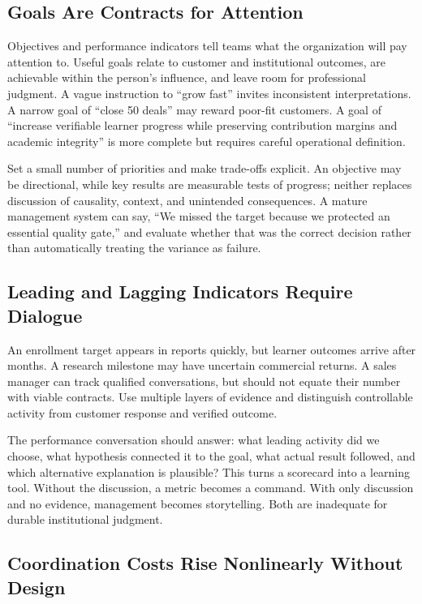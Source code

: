 \subsection{Goals Are Contracts for Attention}
\label{sec:goals_contracts_for_attention}

Objectives and performance indicators tell teams what the organization will pay attention to. Useful goals relate to customer and institutional outcomes, are achievable within the person's influence, and leave room for professional judgment. A vague instruction to ``grow fast'' invites inconsistent interpretations. A narrow goal of ``close 50 deals'' may reward poor-fit customers. A goal of ``increase verifiable learner progress while preserving contribution margins and academic integrity'' is more complete but requires careful operational definition.

Set a small number of priorities and make trade-offs explicit. An objective may be directional, while key results are measurable tests of progress; neither replaces discussion of causality, context, and unintended consequences. A mature management system can say, ``We missed the target because we protected an essential quality gate,'' and evaluate whether that was the correct decision rather than automatically treating the variance as failure.

\subsection{Leading and Lagging Indicators Require Dialogue}
\label{sec:leading_lagging_indicators_dialogue}

An enrollment target appears in reports quickly, but learner outcomes arrive after months. A research milestone may have uncertain commercial returns. A sales manager can track qualified conversations, but should not equate their number with viable contracts. Use multiple layers of evidence and distinguish controllable activity from customer response and verified outcome.

The performance conversation should answer: what leading activity did we choose, what hypothesis connected it to the goal, what actual result followed, and which alternative explanation is plausible? This turns a scorecard into a learning tool. Without the discussion, a metric becomes a command. With only discussion and no evidence, management becomes storytelling. Both are inadequate for durable institutional judgment.

\subsection{Coordination Costs Rise Nonlinearly Without Design}
\label{sec:coordination_costs_nonlinear}

